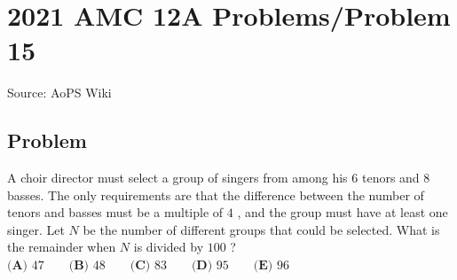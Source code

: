 \documentclass[12pt]{article}
\begin{document}
\section*{{2021 AMC 12A Problems/Problem 15}}
Source: AoPS Wiki

\subsection*{Problem}
A choir director must select a group of singers from among his $6$ tenors and $8$ basses. The only requirements are that the difference between the number of tenors and basses must be a multiple of $4$ , and the group must have at least one singer. Let $N$ be the number of different groups that could be selected. What is the remainder when $N$ is divided by $100$ ? $\textbf{(A) } 47\qquad\textbf{(B) } 48\qquad\textbf{(C) } 83\qquad\textbf{(D) } 95\qquad\textbf{(E) } 96\qquad$
\end{document}
